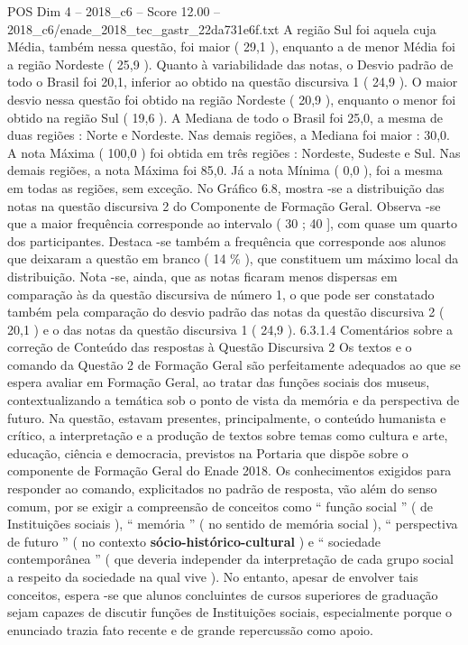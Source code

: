 \begin{textsample}{POS Dim 4 – 2018\_c6 – Score 12.00 – 2018\_c6/enade\_2018\_tec\_gastr\_22da731e6f.txt}
A região Sul foi aquela cuja Média, também nessa questão, foi maior ( 29,1 ), enquanto a de menor Média foi a região Nordeste ( 25,9 ).
Quanto à variabilidade das notas, o Desvio padrão de todo o Brasil foi 20,1, inferior ao obtido na questão discursiva 1 ( 24,9 ).
O maior desvio nessa questão foi obtido na região Nordeste ( 20,9 ), enquanto o menor foi obtido na região Sul ( 19,6 ).
A Mediana de todo o Brasil foi 25,0, a mesma de duas regiões : Norte e Nordeste.
Nas demais regiões, a Mediana foi maior : 30,0.
A nota Máxima ( 100,0 ) foi obtida em três regiões : Nordeste, Sudeste e Sul.
Nas demais regiões, a nota Máxima foi 85,0.
Já a nota Mínima ( 0,0 ), foi a mesma em todas as regiões, sem exceção.
No Gráfico 6.8, mostra -se a distribuição das notas na questão discursiva 2 do Componente de Formação Geral.
Observa -se que a maior frequência corresponde ao intervalo ( 30 ; 40 ], com quase um quarto dos participantes.
Destaca -se também a frequência que corresponde aos alunos que deixaram a questão em branco ( 14 \% ), que constituem um máximo local da distribuição.
Nota -se, ainda, que as notas ficaram menos dispersas em comparação às da questão discursiva de número 1, o que pode ser constatado também pela comparação do desvio padrão das notas da questão discursiva 2 ( 20,1 ) e o das notas da questão discursiva 1 ( 24,9 ). 6.3.1.4 Comentários sobre a correção de Conteúdo das respostas à Questão Discursiva 2 Os textos e o comando da Questão 2 de Formação Geral são perfeitamente adequados ao que se espera avaliar em Formação Geral, ao tratar das funções sociais dos museus, contextualizando a temática sob o ponto de vista da memória e da perspectiva de futuro.
Na questão, estavam presentes, principalmente, o conteúdo humanista e crítico, a interpretação e a produção de textos sobre temas como cultura e arte, educação, ciência e democracia, previstos na Portaria que dispõe sobre o componente de Formação Geral do Enade 2018.
Os conhecimentos exigidos para responder ao comando, explicitados no padrão de resposta, vão além do senso comum, por se exigir a compreensão de conceitos como “ função social ” ( de Instituições sociais ), “ memória ” ( no sentido de memória social ), “ perspectiva de futuro ” ( no contexto \textbf{sócio-histórico-cultural} ) e “ sociedade contemporânea ” ( que deveria independer da interpretação de cada grupo social a respeito da sociedade na qual vive ).
No entanto, apesar de envolver tais conceitos, espera -se que alunos concluintes de cursos superiores de graduação sejam capazes de discutir funções de Instituições sociais, especialmente porque o enunciado trazia fato recente e de grande repercussão como apoio.

\end{textsample}

